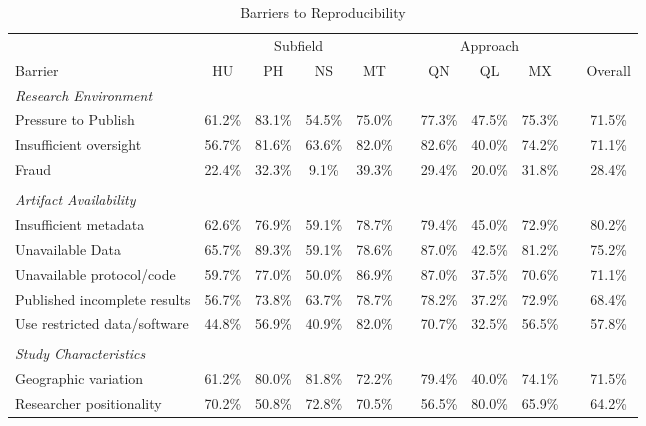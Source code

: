 \documentclass[]{interact}
\theoremstyle{plain}%
\theoremstyle{definition}
\theoremstyle{remark}
\begin{document}
\begin{table}[h]
    \centering
    \begin{threeparttable}
    \caption{Barriers to Reproducibility}
    \begin{tabular}{l c c c c c c c c c c}
         \hline
                    & \multicolumn{4}{1}{Subfield}  & & \multicolumn{3}{1}{Approach} & & \\
         Barrier    & HU & PH & NS & MT            & & QN & QL & MX              & & Overall \\
         \hline
         \textit{Research Environment}      & & & & & & & & & & \\
         Pressure to Publish                & 61.2\% & 83.1\% & 54.5\% & 75.0\% & & 77.3\% & 47.5\% & 75.3\% & & 71.5\% \\
         Insufficient oversight             & 56.7\% & 81.6\% & 63.6\% & 82.0\% & & 82.6\% & 40.0\% & 74.2\% & & 71.1\% \\
         Fraud                              & 22.4\% & 32.3\% & 9.1\%  & 39.3\% & & 29.4\% & 20.0\% & 31.8\% & & 28.4\% \\
                                            & & & & & & & & & &\\
         \textit{Artifact Availability}     & & & & & & & & & & \\
         Insufficient metadata              & 62.6\% & 76.9\% & 59.1\% & 78.7\% & & 79.4\% & 45.0\% & 72.9\% & & 80.2\% \\
         Unavailable Data                   & 65.7\% & 89.3\% & 59.1\% & 78.6\% & & 87.0\% & 42.5\% & 81.2\% & & 75.2\% \\
         Unavailable protocol/code          & 59.7\% & 77.0\% & 50.0\% & 86.9\% & & 87.0\% & 37.5\% & 70.6\% & & 71.1\% \\
         Published incomplete results       & 56.7\% & 73.8\% & 63.7\% & 78.7\% & & 78.2\% & 37.2\% & 72.9\% & & 68.4\% \\
         Use restricted data/software       & 44.8\% & 56.9\% & 40.9\% & 82.0\% & & 70.7\% & 32.5\% & 56.5\% & & 57.8\% \\
                                            & & & & & & & & & &\\
         \textit{Study Characteristics}     & & & & & & & & & & \\
         Geographic variation               & 61.2\% & 80.0\% & 81.8\% & 72.2\% & & 79.4\% & 40.0\% & 74.1\% & & 71.5\% \\
         Researcher positionality           & 70.2\% & 50.8\% & 72.8\% & 70.5\% & & 56.5\% & 80.0\% & 65.9\% & & 64.2\% \\

\end{tabular}
\end{threeparttable}
\end{table}
\end{document}
